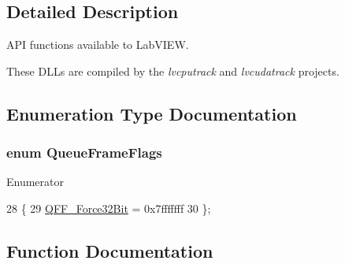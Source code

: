 \subsection{Detailed Description}
A\+PI functions available to Lab\+V\+I\+EW. 

These D\+L\+Ls are compiled by the {\itshape lvcputrack} and {\itshape lvcudatrack} projects. 

\subsection{Enumeration Type Documentation}
\subsubsection[{\texorpdfstring{Queue\+Frame\+Flags}{QueueFrameFlags}}]{\setlength{\rightskip}{0pt plus 5cm}enum {\bf Queue\+Frame\+Flags}}\hypertarget{group__lab___a_p_i_gafd9ebd216f1dd2994e68fa672feaaa41}{}\label{group__lab___a_p_i_gafd9ebd216f1dd2994e68fa672feaaa41}
\begin{Desc}
\item[Enumerator]\par
\begin{description}
\item[{\em 
Q\+F\+F\+\_\+\+Force32\+Bit\hypertarget{group__lab___a_p_i_ggafd9ebd216f1dd2994e68fa672feaaa41a5af6f36a4614e54484ce400b403bb8c8}{}\label{group__lab___a_p_i_ggafd9ebd216f1dd2994e68fa672feaaa41a5af6f36a4614e54484ce400b403bb8c8}
}]\end{description}
\end{Desc}

\begin{DoxyCode}
28                      \{
29     \hyperlink{group__lab___a_p_i_ggafd9ebd216f1dd2994e68fa672feaaa41a5af6f36a4614e54484ce400b403bb8c8}{QFF\_Force32Bit} = 0x7fffffff
30 \};
\end{DoxyCode}


\subsection{Function Documentation}
